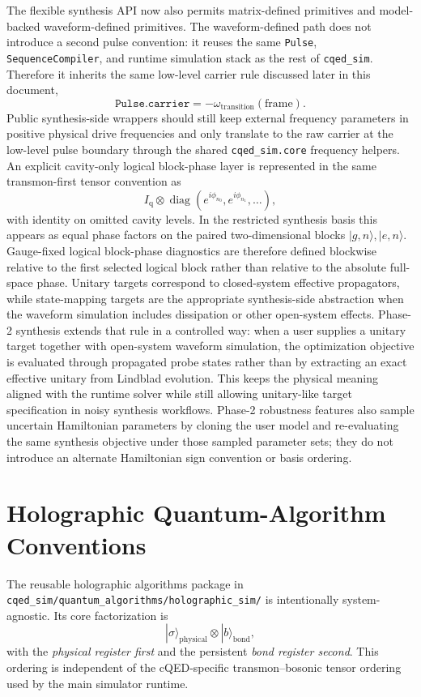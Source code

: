 \documentclass[11pt]{article}
\begin{document}
\noindent
The flexible synthesis API now also permits matrix-defined primitives and
model-backed waveform-defined primitives. The waveform-defined path does not
introduce a second pulse convention: it reuses the same \texttt{Pulse},
\texttt{SequenceCompiler}, and runtime simulation stack as the rest of
\texttt{cqed\_sim}. Therefore it inherits the same low-level carrier rule discussed
later in this document,
\[
\texttt{Pulse.carrier}=-\omega_{\mathrm{transition}}(\text{frame}).
\]
Public synthesis-side wrappers should still keep external frequency parameters
in positive physical drive frequencies and only translate to the raw carrier at
the low-level pulse boundary through the shared \texttt{cqed\_sim.core}
frequency helpers.
An explicit cavity-only logical block-phase layer is represented in the same
transmon-first tensor convention as
\[
I_{\mathrm{q}} \otimes \operatorname{diag}(e^{i\phi_{n_0}}, e^{i\phi_{n_1}}, \ldots),
\]
with identity on omitted cavity levels. In the restricted synthesis basis this
appears as equal phase factors on the paired two-dimensional blocks
\(|g,n\rangle, |e,n\rangle\). Gauge-fixed logical block-phase diagnostics are
therefore defined blockwise relative to the first selected logical block rather
than relative to the absolute full-space phase.
Unitary targets correspond to closed-system effective propagators, while
state-mapping targets are the appropriate synthesis-side abstraction when the
waveform simulation includes dissipation or other open-system effects.
Phase-2 synthesis extends that rule in a controlled way: when a user supplies a
unitary target together with open-system waveform simulation, the optimization
objective is evaluated through propagated probe states rather than by extracting
an exact effective unitary from Lindblad evolution. This keeps the physical
meaning aligned with the runtime solver while still allowing unitary-like target
specification in noisy synthesis workflows. Phase-2 robustness features also
sample uncertain Hamiltonian parameters by cloning the user model and
re-evaluating the same synthesis objective under those sampled parameter sets;
they do not introduce an alternate Hamiltonian sign convention or basis
ordering.

\section{Holographic Quantum-Algorithm Conventions}
The reusable holographic algorithms package in
\texttt{cqed\_sim/quantum\_algorithms/holographic\_sim/} is intentionally
system-agnostic. Its core factorization is
\[
|\sigma\rangle_{\mathrm{physical}} \otimes |b\rangle_{\mathrm{bond}},
\]
with the \emph{physical register first} and the persistent \emph{bond register
second}. This ordering is independent of the cQED-specific transmon--bosonic
tensor ordering used by the main simulator runtime.
\end{document}
